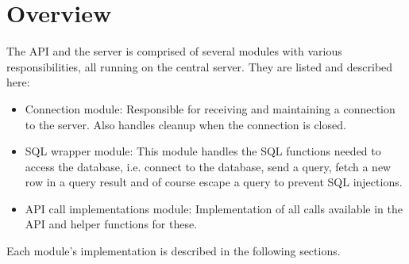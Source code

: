 \section{Overview}
The API and the server is comprised of several modules with various responsibilities, all running on the central server. They are listed and described here:

\begin{itemize}
\item Connection module: Responsible for receiving and maintaining a connection to the server. Also handles cleanup when the connection is closed. 
\item SQL wrapper module: This module handles the SQL functions needed to access the database, i.e. connect to the database, send a query, fetch a new row in a query result and of course escape a query to prevent SQL injections.
\item API call implementations module: Implementation of all calls available in the API and helper functions for these. 
\end{itemize}

Each module's implementation is described in the following sections.